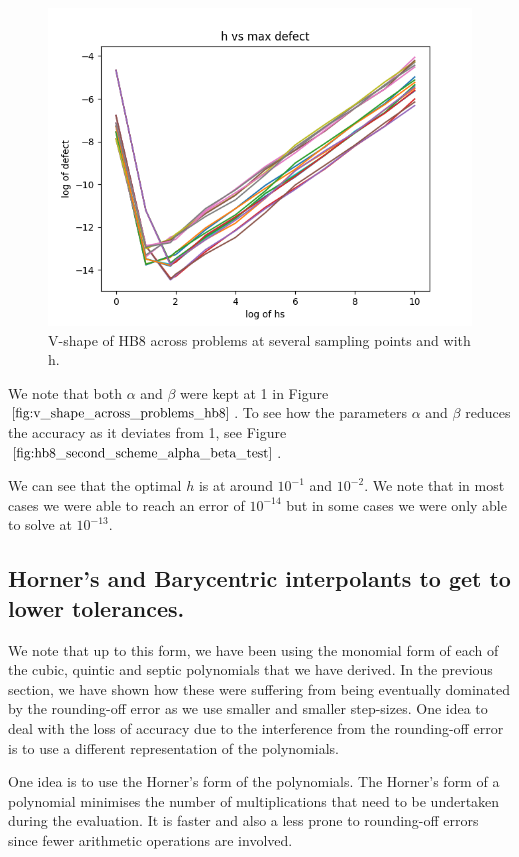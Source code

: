 \begin{figure}[H]
\centering
\includegraphics[width=0.7\linewidth]{./figures/v_shape_across_problems_hb8}
\caption{V-shape of HB8 across problems at several sampling points and with h.}
\label{fig:v_shape_across_problems_hb8}
\end{figure}

We note that both $\alpha$ and $\beta$ were kept at 1 in Figure $\ref{fig:v_shape_across_problems_hb8}$. To see how the parameters $\alpha$ and $\beta$ reduces the accuracy as it deviates from 1, see Figure $\ref{fig:hb8_second_scheme_alpha_beta_test}$.

We can see that the optimal $h$ is at around $10^{-1}$ and $10^{-2}$. We note that in most cases we were able to reach an error of $10^{-14}$ but in some cases we were only able to solve at $10^{-13}$. 

\subsection{Horner's and Barycentric interpolants to get to lower tolerances.}
\label{section:horner_bary_forms}
We note that up to this form, we have been using the monomial form of each of the cubic, quintic and septic polynomials that we have derived. In the previous section, we have shown how these were suffering from being eventually dominated by the rounding-off error as we use smaller and smaller step-sizes. One idea to deal with the loss of accuracy due to the interference from the rounding-off error is to use a different representation of the polynomials. 

One idea is to use the Horner's form of the polynomials. The Horner's form of a polynomial minimises the number of multiplications that need to be undertaken during the evaluation. It is faster and also a less prone to rounding-off errors since fewer arithmetic operations are involved.

